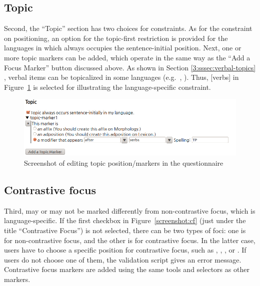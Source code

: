\subsection{Topic}
\label{11:ssec:questionnaire-topic}


Second, the ``Topic'' section has two choices for constraints. As for
the constraint on positioning, an option for the topic-first
restriction is provided for the languages in which  always
occupies the sentence-initial position. Next, one or more topic
markers can be added, which operate in the same way as the ``Add a
Focus Marker'' button discussed above.  As shown in
Section \ref{3:sssec:verbal-topics} , verbal
items can be topicalized in some languages
(e.g.\ , \citealt{chapman:81}).  Thus, [verbs] in
Figure~\ref{screenshot:topic} is selected for illustrating the
language-specific constraint.

\begin{figure}[!t]
\begin{center} 
\includegraphics[width=.9\textwidth]{screenshot/topic.jpg}
\caption{Screenshot of editing topic position/markers in the questionnaire}
\label{screenshot:topic}
\end{center}
\end{figure}





\subsection{Contrastive focus}
\label{11:ssec:questionnaire-cf}

Third,  may or may not be marked differently
from  non-con\-tras\-tive focus, which is language-specific. If the
first checkbox in Figure~\ref{screenshot:cf} (just under the title
``Contrastive Focus'') is not selected, there can be two types of
foci: one is  for non-contrastive focus, and the
other is  for contrastive focus. In the latter
case, users have to choose a specific position for contrastive focus,
such as , , , or
. If users do not choose one of them, the validation
script gives an error message.  Contrastive focus markers are added
using the same tools and selectors as other markers.


